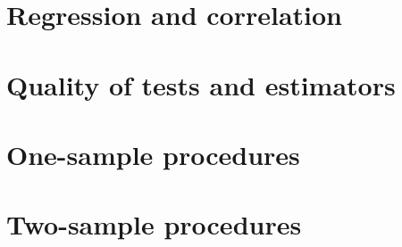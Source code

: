\documentclass[a4paper]{article}
\begin{document}
\section{Regression and correlation}

\section{Quality of tests and estimators}

\section{One-sample procedures}

\section{Two-sample procedures}

\printindex
\end{document}
